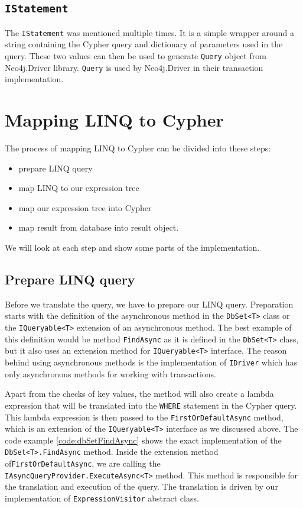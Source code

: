 \subsection{\texttt{IStatement}}

The \texttt{IStatement} was mentioned multiple times.
It is a simple wrapper around a string containing the Cypher query and dictionary of parameters used in the query.
These two values can then be used to generate \texttt{Query} object from Neo4j.Driver library.
\texttt{Query} is used by Neo4j.Driver in their transaction implementation.

\section{Mapping LINQ to Cypher}

The process of mapping LINQ to Cypher can be divided into these steps:
\begin{itemize}
    \item {prepare LINQ query}
    \item {map LINQ to our expression tree}
    \item {map our expression tree into Cypher}
    \item {map result from database into result object.}
\end{itemize}
We will look at each step and show some parts of the implementation.

\subsection{Prepare LINQ query}

Before we translate the query, we have to prepare our LINQ query.
Preparation starts with the definition of the asynchronous method in the \texttt{DbSet<T>} class or the \texttt{IQueryable<T>} extension of an asynchronous method.
The best example of this definition would be method \texttt{FindAsync} as it is defined in the \texttt{DbSet<T>} class, but it also uses an extension method for \texttt{IQueryable<T>} interface.
The reason behind using asynchronous methods is the implementation of \texttt{IDriver} which has only asynchronous methods for working with transactions.

Apart from the checks of key values, the method will also create a lambda expression that will be translated into the \texttt{WHERE} statement in the Cypher query.
This lambda expression is then passed to the \texttt{FirstOrDefaultAsync} method, which is an extension of the \texttt{IQueryable<T>} interface as we discussed above.
The code example \ref{code:dbSetFindAsync} shows the exact implementation of the \texttt{DbSet<T>.FindAsync} method.
Inside the extension method of\linebreak\texttt{FirstOrDefaultAsync}, we are calling the \texttt{IAsyncQueryProvider.\linebreak ExecuteAsync<T>} method.
This method is responsible for the translation and execution of the query. The translation is driven by our implementation of \texttt{ExpressionVisitor} abstract class.

